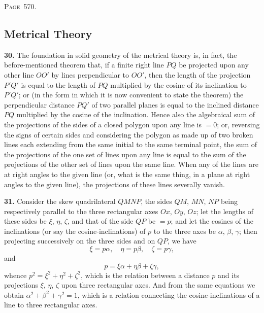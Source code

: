 \documentclass[11pt,a4paper]{book}
\begin{document}
\newpage
\noindent\textsc{Page~570.} \subsection*{Metrical Theory}

\textbf{30.} The foundation in solid geometry of the metrical theory is, in fact, the before-mentioned theorem that, if a finite right line $PQ$ be projected upon any other line $OO'$ by lines perpendicular to $OO'$, then the length of the projection $P'Q'$ is equal to the length of $PQ$ multiplied by the cosine of its inclination to $P'Q'$; or (in the form in which it is now convenient to state the theorem) the perpendicular distance $PQ'$ of two parallel planes is equal to the inclined distance $PQ$ multiplied by the cosine of the inclination. Hence also the algebraical sum of the projections of the sides of a closed polygon upon any line is $=0$; or, reversing the signs of certain sides and considering the polygon as made up of two broken lines each extending from the same initial to the same terminal point, the sum of the projections of the one set of lines upon any line is equal to the sum of the projections of the other set of lines upon the same line. When any of the lines are at right angles to the given line (or, what is the same thing, in a plane at right angles to the given line), the projections of these lines severally vanish.

\textbf{31.} Consider the skew quadrilateral $QMNP$, the sides $QM$, $MN$, $NP$ being respectively parallel to the three rectangular axes $Ox$, $Oy$, $Oz$; let the lengths of these sides be $\xi$, $\eta$, $\zeta$, and that of the side $QP$ be $=p$; and let the cosines of the inclinations (or say the cosine-inclinations) of $p$ to the three axes be $\alpha$, $\beta$, $\gamma$; then projecting successively on the three sides and on $QP$, we have
\[
\xi=p\alpha,\quad \eta=p\beta,\quad \zeta=p\gamma,
\]
and
\[
p=\xi\alpha+\eta\beta+\zeta\gamma,
\]
whence $p^2=\xi^2+\eta^2+\zeta^2$, which is the relation between a distance $p$ and its projections $\xi$, $\eta$, $\zeta$ upon three rectangular axes. And from the same equations we obtain $\alpha^2+\beta^2+\gamma^2=1$, which is a relation connecting the cosine-inclinations of a line to three rectangular axes.
\end{document}
